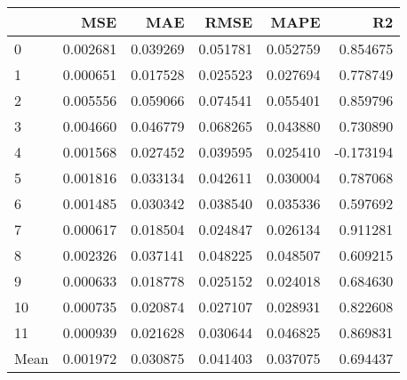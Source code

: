 \begin{tabular}{lrrrrr}
\toprule
 & MSE & MAE & RMSE & MAPE & R2 \\
\midrule
0 & 0.002681 & 0.039269 & 0.051781 & 0.052759 & 0.854675 \\
1 & 0.000651 & 0.017528 & 0.025523 & 0.027694 & 0.778749 \\
2 & 0.005556 & 0.059066 & 0.074541 & 0.055401 & 0.859796 \\
3 & 0.004660 & 0.046779 & 0.068265 & 0.043880 & 0.730890 \\
4 & 0.001568 & 0.027452 & 0.039595 & 0.025410 & -0.173194 \\
5 & 0.001816 & 0.033134 & 0.042611 & 0.030004 & 0.787068 \\
6 & 0.001485 & 0.030342 & 0.038540 & 0.035336 & 0.597692 \\
7 & 0.000617 & 0.018504 & 0.024847 & 0.026134 & 0.911281 \\
8 & 0.002326 & 0.037141 & 0.048225 & 0.048507 & 0.609215 \\
9 & 0.000633 & 0.018778 & 0.025152 & 0.024018 & 0.684630 \\
10 & 0.000735 & 0.020874 & 0.027107 & 0.028931 & 0.822608 \\
11 & 0.000939 & 0.021628 & 0.030644 & 0.046825 & 0.869831 \\
Mean & 0.001972 & 0.030875 & 0.041403 & 0.037075 & 0.694437 \\
\bottomrule
\end{tabular}
